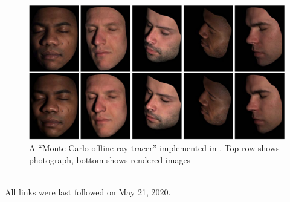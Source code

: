 \documentclass[ngerman,runningheads,a4paper]{llncs}[2018/03/10]
\begin{document}
\begin{figure}
\includegraphics[scale=0.275,keepaspectratio]{./images/monte-carlo-ray-tracer.jpg}
\caption{A \enquote{Monte Carlo offline ray tracer} implemented in \citet{weyrich2006analysis}. Top row shows photograph, bottom shows rendered images}
\end{figure}

\renewcommand{\bibsection}{\section{Referenzen}} %

\begingroup
  \ifluatex
  \else
  \fi
  \small %
  
\endgroup

\ \\
%
All links were last followed on May 21, 2020.
\end{document}
